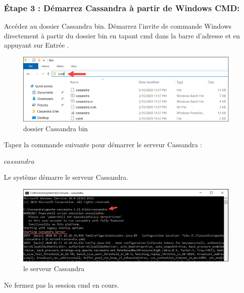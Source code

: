 \subsubsection {Étape 3 : Démarrez Cassandra à partir de Windows CMD:}
Accédez au dossier Cassandra bin. Démarrez l'invite de commande Windows directement à partir du dossier bin en tapant cmd dans la barre d'adresse et en appuyant sur Entrée .

\begin{figure}[h]
	\centering
    \includegraphics[scale=0.6]{img/part3/2.5}
    \caption{dossier Cassandra bin}
\end{figure}

Tapez la commande suivante pour démarrer le serveur Cassandra :

\begin{center}
$cassandra$
\end{center}

Le système démarre le serveur Cassandra.

\begin{figure}[h]
	\centering
    \includegraphics[scale=0.6]{img/part3/2.6}
    \caption{le serveur Cassandra}
\end{figure}

Ne fermez pas la session cmd en cours.